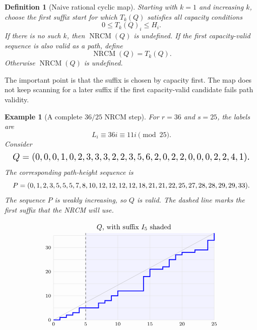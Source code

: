 \documentclass[10pt]{article}
\newtheorem{definition}{Definition}
\newtheorem{example}{Example}
\newcommand{\NRCM}{\operatorname{NRCM}}
\begin{document}
\begin{definition}[Naive rational cyclic map]
Starting with \(k=1\) and increasing \(k\), choose the first suffix start for
which \(T_k(Q)\) satisfies all capacity conditions
\[
  0\le T_k(Q)_i\le H_i.
\]
If there is no such \(k\), then \(\NRCM(Q)\) is undefined.  If the first
capacity-valid sequence is also valid as a path, define
\[
  \NRCM(Q)=T_k(Q).
\]
Otherwise \(\NRCM(Q)\) is undefined.
\end{definition}

The important point is that the suffix is chosen by capacity first.  The map
does not keep scanning for a later suffix if the first capacity-valid candidate
fails path validity.

\begin{example}[A complete \(36/25\) NRCM step]
For \(r=36\) and \(s=25\), the labels are
\[
  L_i\equiv 36i\equiv 11i\pmod{25}.
\]
Consider
\[
\resizebox{.98\textwidth}{!}{$
Q=(0,0,0,1,0,2,3,3,3,2,2,3,5,6,2,0,2,2,0,0,0,2,2,4,1).
$}
\]
The corresponding path-height sequence is
\[
\resizebox{.98\textwidth}{!}{$
P=(0,1,2,3,5,5,5,7,8,10,12,12,12,12,18,21,21,22,25,27,28,28,29,29,33).
$}
\]
The sequence \(P\) is weakly increasing, so \(Q\) is valid.  The dashed line
marks the first suffix that the NRCM will use.

\[
\begin{tikzpicture}[x=.32cm,y=.12cm]
  \fill[blue!5] (5,0) rectangle (25,36);
  \draw[gray!25,step=5] (0,0) grid (25,35);
  \draw[gray!60] (0,0) -- (25,36);
  \draw[dashed] (5,0) -- (5,36);
  \draw[very thick,blue]
    (0,0) -- (1,0) -- (1,1) -- (2,1) -- (2,2) -- (3,2) -- (3,3)
    -- (4,3) -- (4,5) -- (5,5) -- (5,5) -- (6,5) -- (6,5)
    -- (7,5) -- (7,7) -- (8,7) -- (8,8) -- (9,8) -- (9,10)
    -- (10,10) -- (10,12) -- (11,12) -- (11,12) -- (12,12)
    -- (12,12) -- (13,12) -- (13,12) -- (14,12) -- (14,18)
    -- (15,18) -- (15,21) -- (16,21) -- (16,21) -- (17,21)
    -- (17,22) -- (18,22) -- (18,25) -- (19,25) -- (19,27)
    -- (20,27) -- (20,28) -- (21,28) -- (21,28) -- (22,28)
    -- (22,29) -- (23,29) -- (23,29) -- (24,29) -- (24,33)
    -- (25,33) -- (25,36);
  \node[below] at (0,0) {\scriptsize 0};
  \node[below] at (5,0) {\scriptsize 5};
  \node[below] at (10,0) {\scriptsize 10};
  \node[below] at (15,0) {\scriptsize 15};
  \node[below] at (20,0) {\scriptsize 20};
  \node[below] at (25,0) {\scriptsize 25};
  \node[left] at (0,0) {\scriptsize 0};
  \node[left] at (0,10) {\scriptsize 10};
  \node[left] at (0,20) {\scriptsize 20};
  \node[left] at (0,30) {\scriptsize 30};
  \node[above] at (12.5,36) {\(Q\), with suffix \(I_5\) shaded};
\end{tikzpicture}
\]


\end{example}
\end{document}

